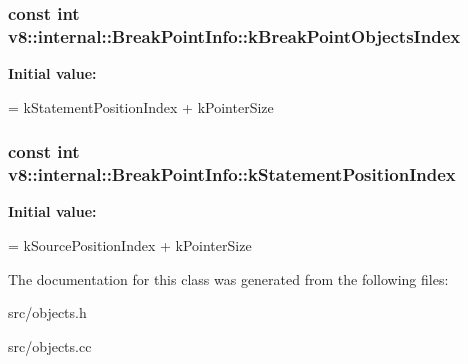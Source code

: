 \subsubsection[{k\+Break\+Point\+Objects\+Index}]{\setlength{\rightskip}{0pt plus 5cm}const int v8\+::internal\+::\+Break\+Point\+Info\+::k\+Break\+Point\+Objects\+Index\hspace{0.3cm}{\ttfamily [static]}}\label{classv8_1_1internal_1_1_break_point_info_ae4ecacd32915b48357a34430c701256f}
{\bfseries Initial value\+:}
\begin{DoxyCode}
=
      kStatementPositionIndex + kPointerSize
\end{DoxyCode}
\hypertarget{classv8_1_1internal_1_1_break_point_info_a4faddc22ed2545a08c99fae693c638cf}{}
\subsubsection[{k\+Statement\+Position\+Index}]{\setlength{\rightskip}{0pt plus 5cm}const int v8\+::internal\+::\+Break\+Point\+Info\+::k\+Statement\+Position\+Index\hspace{0.3cm}{\ttfamily [static]}}\label{classv8_1_1internal_1_1_break_point_info_a4faddc22ed2545a08c99fae693c638cf}
{\bfseries Initial value\+:}
\begin{DoxyCode}
=
      kSourcePositionIndex + kPointerSize
\end{DoxyCode}


The documentation for this class was generated from the following files\+:\begin{DoxyCompactItemize}
\item 
src/objects.\+h\item 
src/objects.\+cc\end{DoxyCompactItemize}
